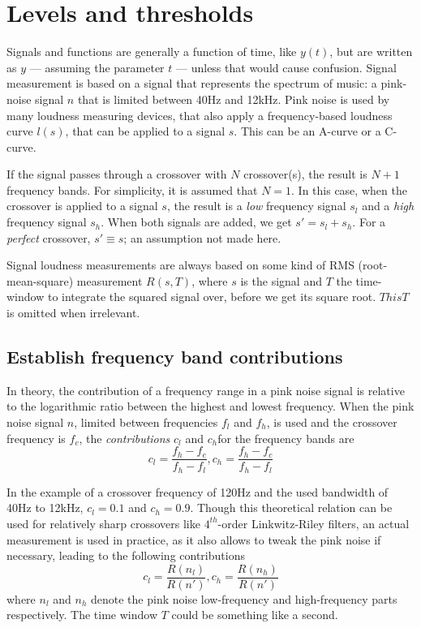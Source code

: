 \documentclass[11pt]{article}
\begin{document}
\section{Levels and thresholds}\label{sec:levels-and-thresholds}

    Signals and functions are generally a function of time, like $y(t)$, but are written as $y$ — assuming the parameter $t$ — unless that would cause confusion.
Signal measurement is based on a signal that represents the spectrum of music: a pink-noise signal $n$ that is limited between 40Hz and 12kHz. Pink noise is used by many loudness measuring devices, that also apply a frequency-based loudness curve $l(s)$, that can be applied to a signal $s$.
This can be an A-curve or a C-curve.

    If the signal passes through a crossover with $N$ crossover(s), the result is $N+1$ frequency bands.
For simplicity, it is assumed that $N=1$.
In this case, when the crossover is applied to a signal $s$, the result is a \emph{low} frequency signal $s_l$ and a \emph{high} frequency signal $s_h$.
When both signals are added, we get $s' = s_l + s_h$.
For a \emph{perfect} crossover, $s' \equiv s$; an assumption not made here.

    Signal loudness measurements are always based on some kind of RMS (root-mean-square) measurement $R(s,T)$, where $s$ is the signal and $T$ the time-window to integrate the squared signal over, before we get its square root.
$ThisT$ is omitted when irrelevant.

\subsection{Establish frequency band contributions}\label{subsec:establish-frequency-band-contributions}

In theory, the contribution of a frequency range in a pink noise signal is relative to the logarithmic ratio between the highest and lowest frequency.
When the pink noise signal $n$, limited between frequencies $f_l$ and $f_h$, is used and the crossover frequency is $f_c$, the \emph{contributions} $c_l$ and $c_h$for the frequency bands are
\[
c_l = \dfrac{f_h - f_c}{f_h - f_l} , c_h = \dfrac{f_h - f_c}{f_h - f_l}
\]

In the example of a crossover frequency of 120Hz and the used bandwidth of 40Hz to 12kHz, $c_l=0.1$ and $c_h=0.9$.
Though this theoretical relation can be used for relatively sharp crossovers like $4^{th}$-order Linkwitz-Riley filters, an actual measurement is used in practice, as it also allows to tweak the pink noise if necessary, leading to the following contributions
    \[
        c_l = \dfrac{R(n_l)}{R(n')} , c_h = \dfrac{R(n_h)}{R(n')}
    \]
where $n_l$ and $n_h$ denote the pink noise low-frequency and high-frequency parts respectively.
The time window $T$ could be something like a second.
\end{document}
